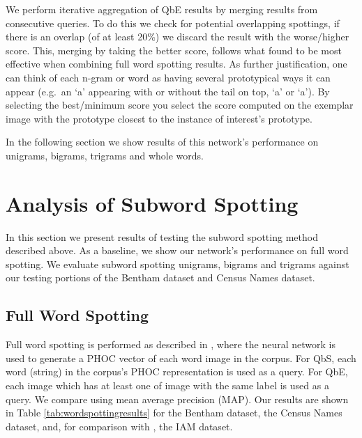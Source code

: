 \documentclass[ms,electronic,twosidetoc,letterpaper,chaptercenter,parttop,lol,lof,lot]{byumsphd}
\begin{document}
We perform iterative aggregation of QbE results by merging results from consecutive queries. To do this we check for potential overlapping spottings, if there is an overlap (of at least 20\%) we discard the result with the worse/higher score. This, merging by taking the better score, follows what \cite{Zagoris2015} found to be most effective when combining full word spotting results. As further justification, one can think of each n-gram or word as having several prototypical ways it can appear (e.g.~an `a' appearing with or without the tail on top, `\textsf{a}' or `{\selectfont\footnotesize a}'). By selecting the best/minimum score you select the score computed on the exemplar image with the prototype closest to the instance of interest's prototype.

In the following section we show results of this network's performance on unigrams, bigrams, trigrams and whole words.


\section{Analysis of Subword Spotting}

In this section we present results of testing the subword spotting method described above.
As a baseline, we show our network's performance on full word spotting. We evaluate subword spotting unigrams, bigrams and trigrams against our testing portions of the Bentham dataset and Census Names dataset. 

\subsection{Full Word Spotting}

Full word spotting is performed as described in \cite{sudholt2016}, where the neural network is used to generate a PHOC vector of each word image in the corpus. For QbS, each word (string) in the corpus's PHOC representation is used as a query. For QbE, each image which has at least one of image with the same label is used as a query. We compare using mean average precision (MAP). Our results are shown in Table \ref{tab:wordspottingresults} for the Bentham dataset, the Census Names dataset, and, for comparison with \cite{sudholt2016}, the IAM dataset.
\end{document}
